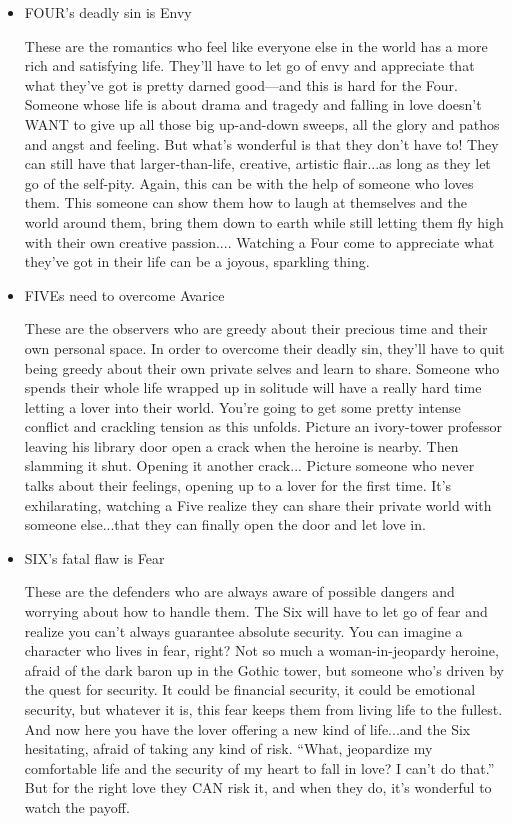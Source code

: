 \documentclass[openleft,oneside,showtrims]{memoir}
\begin{document}
\begin{itemize}
\item FOUR's deadly sin is Envy
\label{sec:org18c2a0b}

These are the romantics who feel like everyone else in the world has a more rich and satisfying life. They'll have to let go of envy and appreciate that what they've got is pretty darned good—and this is hard for the Four. Someone whose life is about drama and tragedy and falling in love doesn't WANT to give up all those big up-and-down sweeps, all the glory and pathos and angst and feeling. But what's wonderful is that they don't have to! They can still have that larger-than-life, creative, artistic flair...as long as they let go of the self-pity. Again, this can be with the help of someone who loves them. This someone can show them how to laugh at themselves and the world around them, bring them down to earth while still letting them fly high with their own creative passion.... Watching a Four come to appreciate what they've got in their life can be a joyous, sparkling thing.

\item FIVEs need to overcome Avarice
\label{sec:orga515a1d}

These are the observers who are greedy about their precious time and their own personal space. In order to overcome their deadly sin, they'll have to quit being greedy about their own private selves and learn to share. Someone who spends their whole life wrapped up in solitude will have a really hard time letting a lover into their world. You're going to get some pretty intense conflict and crackling tension as this unfolds. Picture an ivory-tower professor leaving his library door open a crack when the heroine is nearby. Then slamming it shut. Opening it another crack... Picture someone who never talks about their feelings, opening up to a lover for the first time. It's exhilarating, watching a Five realize they can share their private world with someone else...that they can finally open the door and let love in.

\item SIX's fatal flaw is Fear
\label{sec:org25030e0}

These are the defenders who are always aware of possible dangers and worrying about how to handle them. The Six will have to let go of fear and realize you can't always guarantee absolute security. You can imagine a character who lives in fear, right? Not so much a woman-in-jeopardy heroine, afraid of the dark baron up in the Gothic tower, but someone who's driven by the quest for security. It could be financial security, it could be emotional security, but whatever it is, this fear keeps them from living life to the fullest. And now here you have the lover offering a new kind of life...and the Six hesitating, afraid of taking any kind of risk. ``What, jeopardize my comfortable life and the security of my heart to fall in love? I can't do that.'' But for the right love they CAN risk it, and when they do, it's wonderful to watch the payoff.


\end{itemize}
\end{document}
